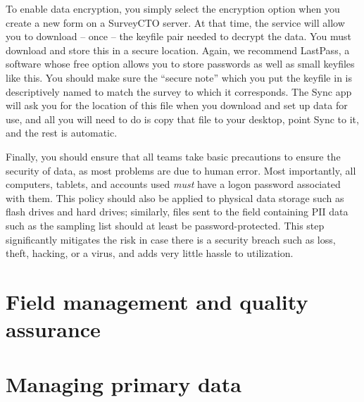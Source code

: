 To enable data encryption, you simply select the encryption option
when you create a new form on a SurveyCTO server.
At that time, the service will allow you to download -- once --
the keyfile pair needed to decrypt the data.
You must download and store this in a secure location.
Again, we recommend LastPass, a software whose free option
allows you to store passwords as well as small keyfiles like this.
You should make sure the ``secure note'' which you put the keyfile in
is descriptively named to match the survey to which it corresponds.
The Sync app will ask you for the location of this file
when you download and set up data for use,
and all you will need to do is copy that file to your desktop,
point Sync to it, and the rest is automatic.

Finally, you should ensure that all teams take basic precautions
to ensure the security of data, as most problems are due to human error.
Most importantly, all computers, tablets, and accounts used
\textit{must} have a logon password associated with them.
This policy should also be applied to physical data storage
such as flash drives and hard drives;
similarly, files sent to the field containing PII data
such as the sampling list should at least be password-protected.
This step significantly mitigates the risk in case there is
a security breach such as loss, theft, hacking, or a virus,
and adds very little hassle to utilization.



\section{Field management and quality assurance}


\section{Managing primary data}
